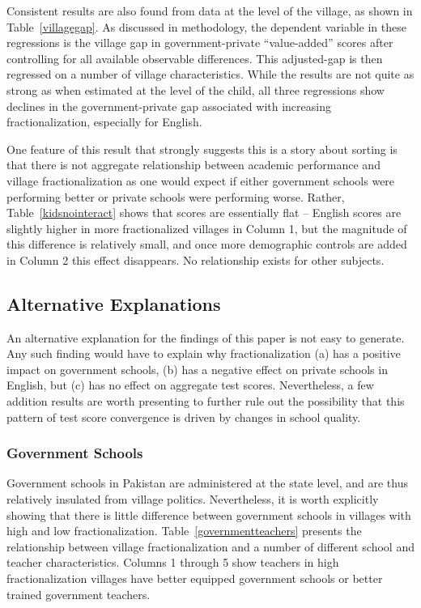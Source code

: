 \documentclass[12pt]{article}
\begin{document}


Consistent results are also found from data at the level of the village, as shown in Table~\ref{villagegap}. As discussed in methodology, the dependent variable in these regressions is the village gap in government-private ``value-added'' scores after controlling for all available observable differences. This adjusted-gap is then regressed on a number of village characteristics. While the results are not quite as strong as when estimated at the level of the child, all three regressions show declines in the government-private gap associated with increasing fractionalization, especially for English. 



One feature of this result that strongly suggests this is a story about sorting is that there is not aggregate relationship between academic performance and village fractionalization as one would expect if either government schools were performing better or private schools were performing worse. Rather, Table~\ref{kidsnointeract} shows that scores are essentially flat -- English scores are slightly higher in more fractionalized villages in Column 1, but the magnitude of this difference is relatively small, and once more demographic controls are added in Column 2 this effect disappears. No relationship exists for other subjects. 




\subsection{Alternative Explanations}\label{}
An alternative explanation for the findings of this paper is not easy to generate. Any such finding would have to explain why fractionalization (a) has a positive impact on government schools, (b) has a negative effect on private schools in English, but (c) has no effect on aggregate test scores. Nevertheless, a few addition results are worth presenting to further rule out the possibility that this pattern of test score convergence is driven by changes in school quality. 

\subsubsection{Government Schools}\label{} 
Government schools in Pakistan are administered at the state level, and are thus relatively insulated from village politics. Nevertheless, it is worth explicitly showing that there is little difference between government schools in villages with high and low fractionalization. Table~\ref{governmentteachers} presents the relationship between village fractionalization and a number of different school and teacher characteristics. Columns 1 through 5 show teachers in high fractionalization villages have better equipped government schools or better trained government teachers. 
\end{document}
